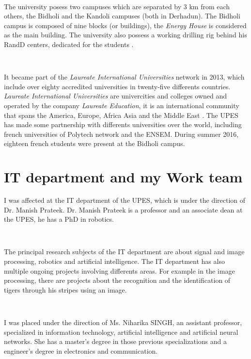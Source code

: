 ~~

The university posess two campuses which are separated by 3 km from each others, the Bidholi and the Kandoli campuses (both in Derhadun). The Bidholi campus is composed of nine blocks (or buildings), the \emph{Energy House} is considered as the main building. The university also possess a working drilling rig behind his \gls{RandD} centers, dedicated for the students \cite{bib:upes:wikipedia}.

~~ 

It became part of the \emph{Laureate International Universities} network in 2013, which include over eighty accredited universities in twenty-five differents countries. \emph{Laureate International Universities} are univercities and colleges owned and operated by the company \emph{Laureate Education}, it is an international community that spans the America, Europe, Africa Asia and the Middle East \cite{bib:laureate:site}. The \gls{UPES} has made some partnership with differents universities over the world, including french universities of  Polytech network and the \gls{ENSEM}. During summer 2016, eighteen french students were present at the Bidholi campus. 


\section{IT department and my Work team}

I was affected at the \gls{IT} department of the \gls{UPES}, which is under the direction of Dr. Manish Prateek. Dr. Manish Prateek is a professor and an associate dean at the \gls{UPES}, he has a PhD in robotics. 

~~

The principal research subjects of the \gls{IT} department are about signal and \gls{image processing}, robotics and artificial intelligence. The \gls{IT} department has also multiple ongoing projects involving differents areas. For example in the \gls{image processing}, there are projects about the recognition and the identification of tigers through his stripes using an image. 

~~

I was placed under the direction of Ms. Niharika SINGH, an assistant professor, specialized in information technology, artificial intelligence and artificial neural networks. She has a master's degree in those previous specializations and a engineer's degree in electronics and communication.

~~

